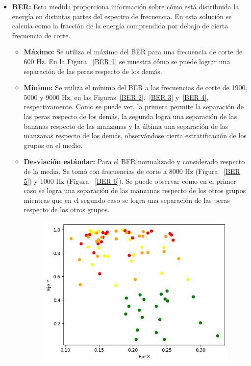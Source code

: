 \documentclass[a4paper, 12pt]{article}
\begin{document}
\begin{itemize}
    \item \textbf{BER:} Esta medida proporciona información sobre cómo está distribuida la energía en distintas partes del espectro de frecuencia. En esta solución se calcula como la fracción de la energía comprendida por debajo de cierta frecuencia de corte.
    \begin{itemize}
        \item \textbf{Máximo:} Se utiliza el máximo del BER para una frecuencia de corte de 600 Hz. En la Figura ~\ref{BER 1} se muestra cómo se puede lograr una separación de las peras respecto de los demás.
        \item \textbf{Mínimo:} Se utiliza el mínimo del BER a las frecuencias de corte de 1900, 5000 y 9000 Hz, en las Figuras~\ref{BER 2},~\ref{BER 3} y~\ref{BER 4}, respectivamente. Como se puede ver, la primera permite la separación de las peras respecto de los demás, la segunda logra una separación de las bananas respecto de las manzanas y la última una separación de las manzanas respecto de los demás, observándose cierta estratificación de los grupos en el medio.
        \item \textbf{Desviación estándar:} Para el BER normalizado y considerado respecto de la media. Se tomó con frecuencias de corte a 8000 Hz (Figura ~\ref{BER 5}) y 1000 Hz (Figura ~\ref{BER 6}). Se puede observar cómo en el primer caso se logra una separación de las manzanas respecto de los otros grupos mientras que en el segundo caso se logra una separación de las peras respecto de los otros grupos.
            \begin{figure}[htbp]
                \begin{minipage}[t]{0.5\textwidth}
                    \centering
                    \includegraphics[width=0.8\linewidth]{BER1.png}

\end{minipage}
\end{figure}
\end{itemize}
\end{itemize}
\end{document}
